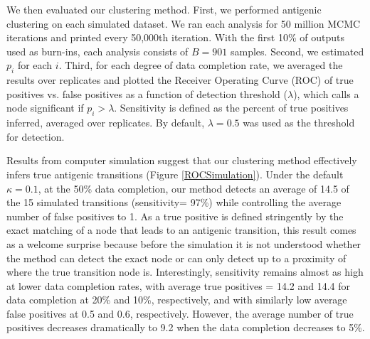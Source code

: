\documentclass[11pt,oneside,letterpaper]{article}
\begin{document}
We then evaluated our clustering method.
First, we performed antigenic clustering on each simulated dataset.
We ran each analysis for 50 million MCMC iterations and printed every 50,000th iteration.
With the first 10\% of outputs used as burn-ins, each analysis consists of $B=901$ samples.
Second, we estimated $p_i$ for each $i$.
Third, for each degree of data completion rate, we averaged the results over replicates and plotted the Receiver Operating Curve (ROC) of true positives vs. false positives as a function of detection threshold ($\lambda$), which calls a node significant if $p_i > \lambda$.
Sensitivity is defined as the percent of true positives inferred, averaged over replicates. By default, $\lambda=0.5$ was used as the threshold for detection.


Results from computer simulation suggest that our clustering method effectively infers true antigenic transitions (Figure \ref{ROCSimulation}). 
Under the default $\kappa=0.1$, at the 50\% data completion, our method detects an average of 14.5 of the 15 simulated transitions (sensitivity= 97\%) while controlling the average number of false positives to 1. 
As a true positive is defined stringently by the exact matching of a node that leads to an antigenic transition, this result comes as a welcome surprise because before the simulation it is not understood whether the method can detect the exact node or can only detect up to a proximity of where the true transition node is.
Interestingly, sensitivity remains almost as high at lower data completion rates, with average true positives = 14.2 and 14.4 for data completion at 20\% and 10\%, respectively, and with similarly low average false positives at 0.5 and 0.6, respectively. 
However, the average number of true positives decreases dramatically to 9.2 when the data completion decreases to 5\%. 
\end{document}
